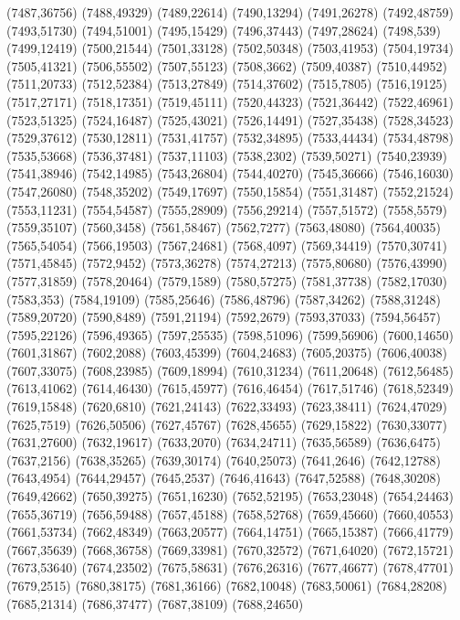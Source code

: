(7487,36756)
(7488,49329)
(7489,22614)
(7490,13294)
(7491,26278)
(7492,48759)
(7493,51730)
(7494,51001)
(7495,15429)
(7496,37443)
(7497,28624)
(7498,539)
(7499,12419)
(7500,21544)
(7501,33128)
(7502,50348)
(7503,41953)
(7504,19734)
(7505,41321)
(7506,55502)
(7507,55123)
(7508,3662)
(7509,40387)
(7510,44952)
(7511,20733)
(7512,52384)
(7513,27849)
(7514,37602)
(7515,7805)
(7516,19125)
(7517,27171)
(7518,17351)
(7519,45111)
(7520,44323)
(7521,36442)
(7522,46961)
(7523,51325)
(7524,16487)
(7525,43021)
(7526,14491)
(7527,35438)
(7528,34523)
(7529,37612)
(7530,12811)
(7531,41757)
(7532,34895)
(7533,44434)
(7534,48798)
(7535,53668)
(7536,37481)
(7537,11103)
(7538,2302)
(7539,50271)
(7540,23939)
(7541,38946)
(7542,14985)
(7543,26804)
(7544,40270)
(7545,36666)
(7546,16030)
(7547,26080)
(7548,35202)
(7549,17697)
(7550,15854)
(7551,31487)
(7552,21524)
(7553,11231)
(7554,54587)
(7555,28909)
(7556,29214)
(7557,51572)
(7558,5579)
(7559,35107)
(7560,3458)
(7561,58467)
(7562,7277)
(7563,48080)
(7564,40035)
(7565,54054)
(7566,19503)
(7567,24681)
(7568,4097)
(7569,34419)
(7570,30741)
(7571,45845)
(7572,9452)
(7573,36278)
(7574,27213)
(7575,80680)
(7576,43990)
(7577,31859)
(7578,20464)
(7579,1589)
(7580,57275)
(7581,37738)
(7582,17030)
(7583,353)
(7584,19109)
(7585,25646)
(7586,48796)
(7587,34262)
(7588,31248)
(7589,20720)
(7590,8489)
(7591,21194)
(7592,2679)
(7593,37033)
(7594,56457)
(7595,22126)
(7596,49365)
(7597,25535)
(7598,51096)
(7599,56906)
(7600,14650)
(7601,31867)
(7602,2088)
(7603,45399)
(7604,24683)
(7605,20375)
(7606,40038)
(7607,33075)
(7608,23985)
(7609,18994)
(7610,31234)
(7611,20648)
(7612,56485)
(7613,41062)
(7614,46430)
(7615,45977)
(7616,46454)
(7617,51746)
(7618,52349)
(7619,15848)
(7620,6810)
(7621,24143)
(7622,33493)
(7623,38411)
(7624,47029)
(7625,7519)
(7626,50506)
(7627,45767)
(7628,45655)
(7629,15822)
(7630,33077)
(7631,27600)
(7632,19617)
(7633,2070)
(7634,24711)
(7635,56589)
(7636,6475)
(7637,2156)
(7638,35265)
(7639,30174)
(7640,25073)
(7641,2646)
(7642,12788)
(7643,4954)
(7644,29457)
(7645,2537)
(7646,41643)
(7647,52588)
(7648,30208)
(7649,42662)
(7650,39275)
(7651,16230)
(7652,52195)
(7653,23048)
(7654,24463)
(7655,36719)
(7656,59488)
(7657,45188)
(7658,52768)
(7659,45660)
(7660,40553)
(7661,53734)
(7662,48349)
(7663,20577)
(7664,14751)
(7665,15387)
(7666,41779)
(7667,35639)
(7668,36758)
(7669,33981)
(7670,32572)
(7671,64020)
(7672,15721)
(7673,53640)
(7674,23502)
(7675,58631)
(7676,26316)
(7677,46677)
(7678,47701)
(7679,2515)
(7680,38175)
(7681,36166)
(7682,10048)
(7683,50061)
(7684,28208)
(7685,21314)
(7686,37477)
(7687,38109)
(7688,24650)
